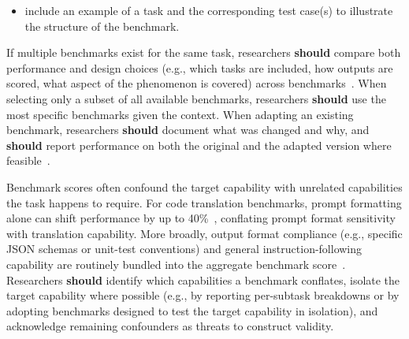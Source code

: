 \documentclass[smallextended]{svjour3}
\newcommand{\should}{\textbf{should}\xspace}
\begin{document}
\begin{itemize}
    \item include an example of a task and the corresponding test case(s) to illustrate the structure of the benchmark.
\end{itemize}

If multiple benchmarks exist for the same task, researchers \should compare both performance and design choices (e.g., which tasks are included, how outputs are scored, what aspect of the phenomenon is covered) across benchmarks~\cite{bean2025measuring}.
When selecting only a subset of all available benchmarks, researchers \should use the most specific benchmarks given the context.
When adapting an existing benchmark, researchers \should document what was changed and why, and \should report performance on both the original and the adapted version where feasible~\cite{bean2025measuring}.

Benchmark scores often confound the target capability with unrelated capabilities the task happens to require. For code translation benchmarks, prompt formatting alone can shift performance by up to 40\%~\cite{DBLP:journals/corr/abs-2411-10541, cao2025should}, conflating prompt format sensitivity with translation capability. More broadly, output format compliance (e.g., specific JSON schemas or unit-test conventions) and general instruction-following capability are routinely bundled into the aggregate benchmark score~\cite{bean2025measuring}. Researchers \should identify which capabilities a benchmark conflates, isolate the target capability where possible (e.g., by reporting per-subtask breakdowns or by adopting benchmarks designed to test the target capability in isolation), and acknowledge remaining confounders as threats to construct validity.
\end{document}

